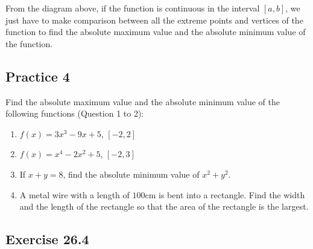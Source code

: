 \documentclass{report}
\begin{document}
From the diagram above, if the function is continuous in the interval $[a, b]$,
we just have to make comparison between all the extreme points and vertices of
the function to find the absolute maximum value and the absolute minimum value
of the function.

\subsection{Practice 4}

Find the absolute maximum value and the absolute minimum value of the following
functions (Question 1 to 2):
\begin{enumerate}
    \item $f(x) = 3x^3 - 9x + 5$, $[-2, 2]$
    \item $f(x) = x^4 - 2x^2 + 5$, $[-2, 3]$
    \item If $x + y = 8$, find the absolute minimum value of $x^2 + y^2$.
    \item A metal wire with a length of $100$cm is bent into a rectangle. Find the width
          and the length of the rectangle so that the area of the rectangle is the
          largest.
\end{enumerate}

\subsection{Exercise 26.4}
\end{document}
